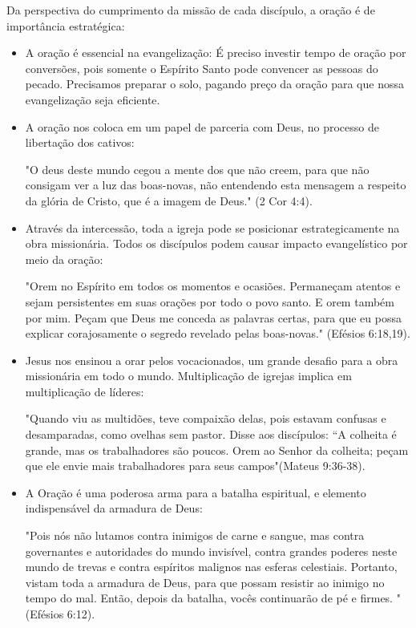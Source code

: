 \documentclass[12pt,openright,oneside,a4paper,
english,french,spanish,brazil]{abntex2}
\begin{document}
  Da perspectiva do cumprimento da missão de cada discípulo, a oração é de importância estratégica:

  \begin{itemize}
	\item A oração é essencial na evangelização: É preciso investir tempo de oração por conversões, pois somente o Espírito Santo pode convencer as pessoas do pecado. Precisamos preparar o solo, pagando preço da oração para que nossa evangelização seja eficiente.
	\item A oração nos coloca em um papel de parceria com Deus, no processo de libertação dos cativos: \begin{citacao}"O deus deste mundo cegou a mente dos que não creem, para que não consigam ver a luz das boas-novas, não entendendo esta mensagem a respeito da glória de Cristo, que é a imagem de Deus." (2 Cor 4:4).\end{citacao}
	\item Através da intercessão, toda a igreja pode se posicionar estrategicamente na obra missionária. Todos os discípulos podem causar impacto evangelístico por meio da oração: \begin{citacao}"Orem no Espírito em todos os momentos e ocasiões. Permaneçam atentos e sejam persistentes em suas orações por todo o povo santo. E orem também por mim. Peçam que Deus me conceda as palavras certas, para que eu possa explicar corajosamente o segredo revelado pelas boas-novas." (Efésios 6:18,19).\end{citacao}
	\item Jesus nos ensinou a orar pelos vocacionados, um grande desafio para a obra missionária em todo o mundo. Multiplicação de igrejas implica em multiplicação de líderes: \begin{citacao}"Quando viu as multidões, teve compaixão delas, pois estavam confusas e desamparadas, como ovelhas sem pastor. Disse aos discípulos: “A colheita é grande, mas os trabalhadores são poucos. Orem ao Senhor da colheita; peçam que ele envie mais trabalhadores para seus campos"(Mateus 9:36-38).\end{citacao}
	\item A Oração é uma poderosa arma para a batalha espiritual, e elemento indispensável da armadura de Deus: \begin{citacao}"Pois nós não lutamos contra inimigos de carne e sangue, mas contra governantes e autoridades do mundo invisível, contra grandes poderes neste mundo de trevas e contra espíritos malignos nas esferas celestiais. Portanto, vistam toda a armadura de Deus, para que possam resistir ao inimigo no tempo do mal. Então, depois da batalha, vocês continuarão de pé e firmes. "(Efésios 6:12).\end{citacao}
  
	\cite[p. 32-34]{brandao}
\end{itemize}
\end{document}
